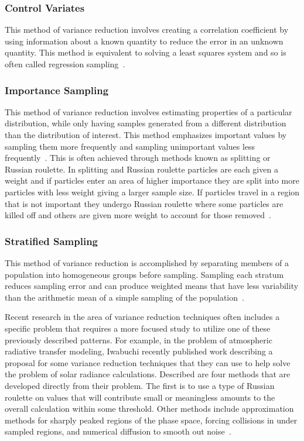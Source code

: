 \subsubsection*{\textbf{Control Variates}} This method of variance reduction involves creating a correlation coefficient by using information about a known quantity to reduce the error in an unknown quantity. This method is equivalent to solving a least squares system and so is often called regression sampling~\cite{wikipediaControlVaraites}.

\subsubsection*{\textbf{Importance Sampling}} This method of variance reduction involves estimating properties of a particular distribution, while only having samples generated from a different distribution than the distribution of interest. This method emphasizes important values by sampling them more frequently and sampling unimportant values less frequently~\cite{wikipediaImportanceSampling}. This is often achieved through methods known as splitting or Russian roulette. In splitting and Russian roulette particles are each given a weight and if particles enter an area of higher importance they are split into more particles with less weight giving a larger sample size. If particles travel in a region that is not important they undergo Russian roulette where some particles are killed off and others are given more weight to account for those removed~\cite{melnik2000rare}.

\subsubsection*{\textbf{Stratified Sampling}} This method of variance reduction is accomplished by separating members of a population into homogeneous groups before sampling. Sampling each stratum reduces sampling error and can produce weighted means that have less variability than the arithmetic mean of a simple sampling of the population~\cite{wikipediaStratifiedSampling}.

Recent research in the area of variance reduction techniques often includes a specific problem that requires a more focused study to utilize one of these previously described patterns.
%
For example, in the problem of atmospheric radiative transfer modeling, Iwabuchi recently published work describing a proposal for some variance reduction techniques that they can use to help solve the problem of solar radiance calculations.
%
Described are four methods that are developed directly from their problem.
%
The first is to use a type of Russian roulette on values that will contribute small or meaningless amounts to the overall calculation within some threshold.
%
Other methods include approximation methods for sharply peaked regions of the phase space, forcing collisions in under sampled regions, and numerical diffusion to smooth out noise~\cite{iwabuchi2015efficient}.
 
